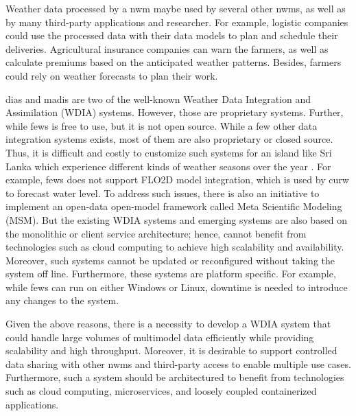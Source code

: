 Weather data processed by a \acrshort{nwm} maybe used by several other \acrshort{nwm}s, as well as by many third-party applications and researcher. For example, logistic companies could use the processed data with their data models to plan and schedule their deliveries. Agricultural insurance companies can warn the farmers, as well as calculate premiums based on the anticipated weather patterns. Besides, farmers could rely on weather forecasts to plan their work.

\acrfull{dias} \cite{Kawasaki2018DataReduction} and \acrfull{madis} \cite{Macdermaid2005ArchitectureP2.39} are two of the well-known Weather Data Integration and Assimilation (WDIA) systems. However, those are proprietary systems. Further, while \acrfull{fews} \cite{Werner2013TheSystem} is free to use, but it is not open source. While a few other data integration systems exists, most of them are also proprietary or closed source. Thus, it is difficult and costly to customize such systems for an island like Sri Lanka which experience different kinds of weather seasons over the year \cite{NaveendrakumarFiveLanka}.
For example, \acrshort{fews} does not support FLO2D model integration, which is used by \acrshort{curw} to forecast water level.
To address such issues, there is also an initiative to implement an open-data open-model framework called Meta Scientific Modeling (MSM). 
But the existing WDIA systems and emerging systems are also based on the monolithic or client service architecture; hence, cannot benefit from technologies such as cloud computing to achieve high scalability and availability. Moreover, such systems cannot be updated or reconfigured without taking the system off line. Furthermore, these systems are platform specific. For example, while \acrshort{fews} can run on either Windows or Linux, downtime is needed to introduce any changes to the system. 

Given the above reasons, there is a necessity to develop a WDIA system that could handle large volumes of multimodel data efficiently while providing scalability and high throughput. Moreover, it is desirable to support controlled data sharing with other \acrshort{nwm}s and third-party access to enable multiple use cases. Furthermore, such a system should be architectured to benefit from technologies such as cloud computing, microservices, and loosely coupled containerized applications.
